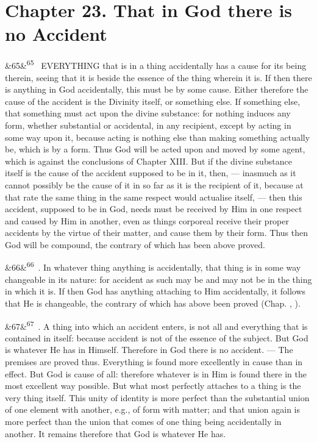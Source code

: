 \documentclass[12pt]{article}
\newcommand{\para}[1][]{\par\noindent\ifx&#1&\else\textsuperscript{\footnotesize #1}~\fi}
\begin{document}
\section*{Chapter 23. That in God there is no Accident}

\para[65] EVERYTHING that is in a thing accidentally has a cause for its being therein, seeing that it is beside the essence of the thing wherein it is. If then there is anything in God accidentally, this must be by some cause. Either therefore the cause of the accident is the Divinity itself, or something else. If something else, that something must act upon the divine substance: for nothing induces any form, whether substantial or accidental, in any recipient, except by acting in some way upon it, because acting is nothing else than making something actually be, which is by a form. Thus God will be acted upon and moved by some agent, which is against the conclusions of Chapter XIII. But if the divine substance itself is the cause of the accident supposed to be in it, then, --- inasmuch as it cannot possibly be the cause of it in so far as it is the recipient of it, because at that rate the same thing in the same respect would actualise itself, --- then this accident, supposed to be in God, needs must be received by Him in one respect and caused by Him in another, even as things corporeal receive their proper accidents by the virtue of their matter, and cause them by their form. Thus then God will be compound, the contrary of which has been above proved.

\para[66] 4. In whatever thing anything is accidentally, that thing is in some way changeable in its nature: for accident as such may be and may not be in the thing in which it is. If then God has anything attaching to Him accidentally, it follows that He is changeable, the contrary of which has above been proved (Chap. , ).

\para[67] 5. A thing into which an accident enters, is not all and everything that is contained in itself: because accident is not of the essence of the subject. But God is whatever He has in Himself. Therefore in God there is no accident. --- The premises are proved thus. Everything is found more excellently in cause than in effect. But God is cause of all: therefore whatever is in Him is found there in the most excellent way possible. But what most perfectly attaches to a thing is the very thing itself. This unity of identity is more perfect than the substantial union of one element with another, e.g., of form with matter; and that union again is more perfect than the union that comes of one thing being accidentally in another. It remains therefore that God is whatever He has.
\end{document}
